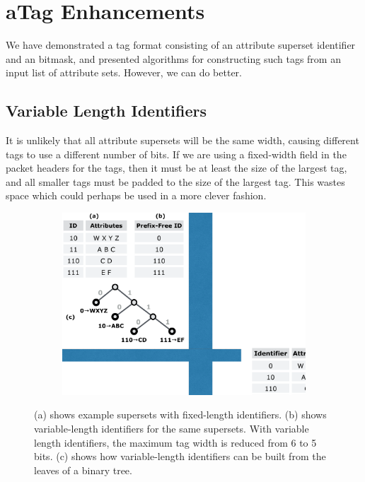 \section{aTag Enhancements}
We have demonstrated a tag format consisting of an attribute superset identifier and an bitmask, and presented algorithms for constructing such tags from an input list of attribute sets. However, we can do better.



\subsection{Variable Length Identifiers}
It is unlikely that all attribute supersets will be the same width, causing different tags to use a different number of bits. If we are using a fixed-width field in the packet headers for the tags, then it must be at least the size of the largest tag, and all smaller tags must be padded to the size of the largest tag. This wastes space which could perhaps be used in a more clever fashion.

\begin{figure}[t!] 
\begin{minipage}{1\linewidth}
\begin{subfigure}[c]{0.96\linewidth}
\includegraphics[trim={0 7cm 18cm 0}, clip, width=\linewidth]{figures/variable_identifiers}
\end{subfigure} 
\end{minipage} 
\caption{(a) shows example supersets with fixed-length identifiers. (b) shows variable-length identifiers for the same supersets. With variable length identifiers, the maximum tag width is reduced from 6 to 5 bits. (c) shows how variable-length identifiers can be built from the leaves of a binary tree.}
\label{fig:variable_id}
\end{figure}

